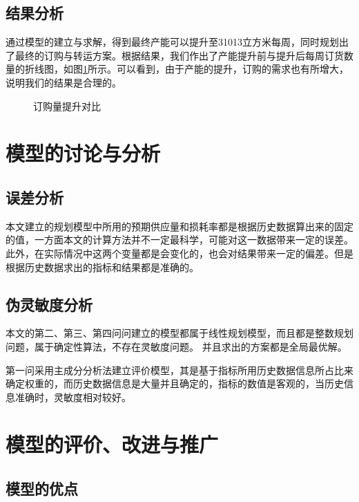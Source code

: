 \documentclass[withoutpreface,bwprint]{cumcmthesis} %
\begin{document}
\subsection{结果分析}

通过模型的建立与求解，得到最终产能可以提升至31013立方米每周，同时规划出了最终的订购与转运方案。根据结果，我们作出了产能提升前与提升后每周订货数量的折线图，如图\ref{产能提升对比}所示。可以看到，由于产能的提升，订购的需求也有所增大，说明我们的结果是合理的。
\begin{figure}[H]
    \label{产能提升对比}
    \caption{订购量提升对比}
\end{figure}


\section{模型的讨论与分析}

\subsection{误差分析}
本文建立的规划模型中所用的预期供应量和损耗率都是根据历史数据算出来的固定的值，一方面本文的计算方法并不一定最科学，可能对这一数据带来一定的误差。此外，在实际情况中这两个变量都是会变化的，也会对结果带来一定的偏差。但是根据历史数据求出的指标和结果都是准确的。

\subsection{伪灵敏度分析}
本文的第二、第三、第四问问建立的模型都属于线性规划模型，而且都是整数规划问题，属于确定性算法，不存在灵敏度问题。 并且求出的方案都是全局最优解。

第一问采用主成分分析法建立评价模型，其是基于指标所用历史数据信息所占比来确定权重的，而历史数据信息是大量并且确定的，指标的数值是客观的，当历史信息准确时，灵敏度相对较好。

\section{模型的评价、改进与推广}



\subsection{模型的优点}
\end{document}
